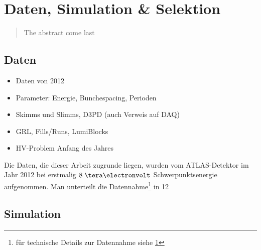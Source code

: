 


\chapter{Daten, Simulation \& Selektion}

\begin{quote}
    The abstract come last
\end{quote}



\section{Daten}
\label{data_sim_selection:data}

\begin{itemize}
    \item Daten von 2012
    \item Parameter: Energie, Bunchespacing, Perioden
    \item Skimms und Slimms, D3PD (auch Verweis auf DAQ)
    \item GRL, Fills/Runs, LumiBlocks
    \item HV-Problem Anfang des Jahres
\end{itemize}

Die Daten, die dieser Arbeit zugrunde liegen, wurden vom ATLAS-Detektor im Jahr
2012 bei erstmalig $8 \TeV$ Schwerpunktsenergie aufgenommen. Man unterteilt die
Datennahme\footnote{für technische Details zur Datennahme siehe \ref{}}
in 12




\section{Simulation}
\label{data_sim_selection:simulation}

